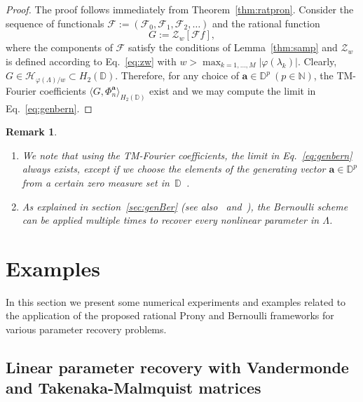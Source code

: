 \documentclass{arxiv}
\newtheorem{remarks}{Remark}[section]
\begin{document}
\begin{proof}
    The proof follows immediately from Theorem~\ref{thm:ratpron}. 
    Consider the sequence of functionals $\mathcal{F} := (\mathcal{F}_0, \mathcal{F}_1, \mathcal{F}_2, \ldots)$ and the rational function
    \begin{equation*}
        G := \mathcal{Z}_{w}[\mathcal{F}f],
    \end{equation*}
    where the components of $\mathcal{F}$ satisfy the conditions of Lemma~\ref{thm:samp} and $\mathcal{Z}_{w}$ is defined according to Eq.~\eqref{eq:zw} with $w > \max_{k=1,\ldots,M} |\varphi(\lambda_k)|$. Clearly, $G \in \mathcal{H}_{\varphi(\Lambda)/w} \subset H_2(\mathbb{D})$. Therefore, for any choice of $\boldsymbol{a} \in \mathbb{D}^p \ (p \in \mathbb{N})$, the TM-Fourier coefficients $\langle G, \Phi_n^{\boldsymbol{a}} \rangle_{H_2(\mathbb{D})}$ exist and we may compute the limit in Eq.~\eqref{eq:genbern}.
\end{proof}

\begin{remarks}
\begin{enumerate}[label = \alph*)]
    \item We note that using the TM-Fourier coefficients, the limit in Eq.~\eqref{eq:genbern} always exists, except if we choose the elements of the generating vector $\boldsymbol{a} \in \mathbb{D}^p$ from a certain zero measure set in~$\mathbb{D}$~\cite{SS1}.

    \item As explained in section~\ref{sec:genBer} (see also~\cite{SBS, SSSAB} and~\cite{siamdozsa}), the Bernoulli scheme can be applied multiple times to recover every nonlinear parameter in $\Lambda$.
\end{enumerate}
\end{remarks}

\section{Examples}
\label{sec:ex}

In this section we present some numerical experiments and examples related to the application of the proposed rational Prony and Bernoulli frameworks for various parameter recovery problems. 

\subsection{Linear parameter recovery with Vandermonde and Takenaka-Malmquist matrices}
\label{sec:exp1}
\end{document}
